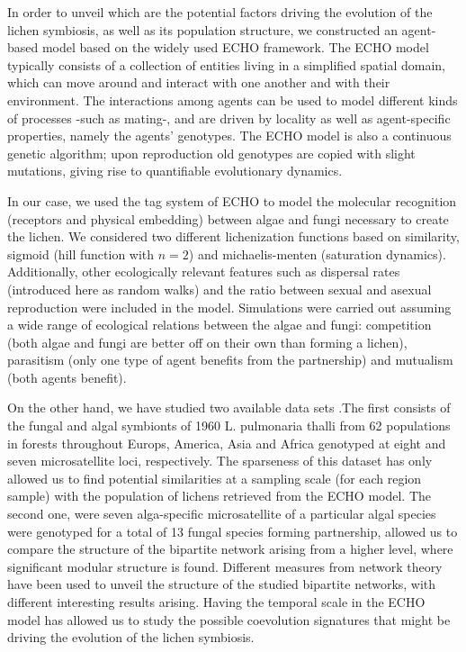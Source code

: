 \documentclass[runningheads,a4paper]{llncs}
\begin{document}
In order to unveil which are the potential factors driving the evolution of the lichen symbiosis, as well as its population structure, we constructed an agent-based model based on the widely used ECHO framework\cite{holland1999echoing,holland1995hidden}. The ECHO model typically consists of a collection of entities living in a simplified spatial domain, which can move around and interact with one another and with their environment. The interactions among agents can be used to model different kinds of processes -such as mating-, and are driven by locality as well as agent-specific properties, namely the agents' genotypes. The ECHO model is also a continuous genetic algorithm\cite{mitchell1998introduction}; upon reproduction old genotypes are copied with slight mutations, giving rise to quantifiable evolutionary dynamics.

In our case, we used the tag system of ECHO to model the molecular recognition (receptors and physical embedding) between algae and fungi necessary to create the lichen. We considered two different lichenization functions based on similarity, sigmoid (hill function with $n=2$) and michaelis-menten (saturation dynamics). Additionally, other ecologically relevant features such as dispersal rates (introduced here as random walks) and the ratio between sexual and asexual reproduction were included in the model. Simulations were carried out assuming a wide range of ecological relations between the algae and fungi: competition (both algae and fungi are better off on their own than forming a lichen), parasitism (only one type of agent benefits from the partnership) and mutualism (both agents benefit).

On the other hand, we have studied two available data sets \cite{dal2012vertical,dal2014molecular}.The first consists of the fungal and algal symbionts of 1960 L. pulmonaria thalli from 62 populations in forests throughout Europs, America, Asia and Africa genotyped at eight and seven microsatellite loci, respectively. The sparseness of this dataset has only allowed us to find potential similarities at a sampling scale (for each region sample) with the population of lichens retrieved from the ECHO model. The second one, were seven alga-specific microsatellite of a particular algal species were genotyped for a total of 13 fungal species forming partnership, allowed us to compare the structure of the bipartite network arising from a higher level, where significant modular structure is found. Different measures from network theory have been used to unveil the structure of the studied bipartite networks, with different interesting results arising. Having the temporal scale in the ECHO model has allowed us to study the possible coevolution signatures that might be driving the evolution of the lichen symbiosis. 
\end{document}

